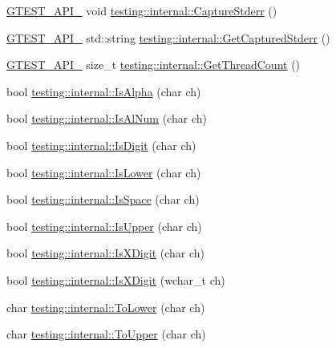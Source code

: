 \begin{DoxyCompactItemize}
\item 
\hyperlink{gtest-port_8h_aa73be6f0ba4a7456180a94904ce17790}{G\+T\+E\+S\+T\+\_\+\+A\+P\+I\+\_\+} void \hyperlink{namespacetesting_1_1internal_a8ec00d458d0d442bd64af7b5f9c22dda}{testing\+::internal\+::\+Capture\+Stderr} ()
\item 
\hyperlink{gtest-port_8h_aa73be6f0ba4a7456180a94904ce17790}{G\+T\+E\+S\+T\+\_\+\+A\+P\+I\+\_\+} std\+::string \hyperlink{namespacetesting_1_1internal_a374156401da17704099d0c33fa53adfb}{testing\+::internal\+::\+Get\+Captured\+Stderr} ()
\item 
\hyperlink{gtest-port_8h_aa73be6f0ba4a7456180a94904ce17790}{G\+T\+E\+S\+T\+\_\+\+A\+P\+I\+\_\+} size\+\_\+t \hyperlink{namespacetesting_1_1internal_a8cbd8bf820517923d7f3c4477b3af5fa}{testing\+::internal\+::\+Get\+Thread\+Count} ()
\item 
bool \hyperlink{namespacetesting_1_1internal_aeb957087fd6bbf9db98ab7cd41b0c129}{testing\+::internal\+::\+Is\+Alpha} (char ch)
\item 
bool \hyperlink{namespacetesting_1_1internal_a83802e7f23324cd512232203662e1a98}{testing\+::internal\+::\+Is\+Al\+Num} (char ch)
\item 
bool \hyperlink{namespacetesting_1_1internal_a4bd96b7fa6486802d33ddc217af55a39}{testing\+::internal\+::\+Is\+Digit} (char ch)
\item 
bool \hyperlink{namespacetesting_1_1internal_ac26ce3883bc8919c27074975e958f3b7}{testing\+::internal\+::\+Is\+Lower} (char ch)
\item 
bool \hyperlink{namespacetesting_1_1internal_af429e04f70f9c10f6aa76a5d1ccd389f}{testing\+::internal\+::\+Is\+Space} (char ch)
\item 
bool \hyperlink{namespacetesting_1_1internal_a84f3baa379fec6bf5947cb5165aa8cc9}{testing\+::internal\+::\+Is\+Upper} (char ch)
\item 
bool \hyperlink{namespacetesting_1_1internal_aa234ef141278263fb143b616c74c86e7}{testing\+::internal\+::\+Is\+X\+Digit} (char ch)
\item 
bool \hyperlink{namespacetesting_1_1internal_a6ab68a30f8291c09b2289c132bbe3b16}{testing\+::internal\+::\+Is\+X\+Digit} (wchar\+\_\+t ch)
\item 
char \hyperlink{namespacetesting_1_1internal_ad9c627ef2a94245e3fd69e7ab3d49b42}{testing\+::internal\+::\+To\+Lower} (char ch)
\item 
char \hyperlink{namespacetesting_1_1internal_ac1b876a8133895bd553d4780ecaa1e3a}{testing\+::internal\+::\+To\+Upper} (char ch)
\item 

\end{DoxyCompactItemize}
